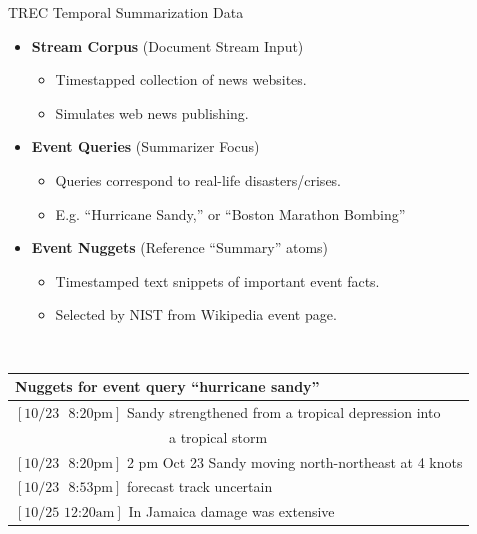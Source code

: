 \begin{frame}{TREC Temporal Summarization Data}
  \begin{itemize}
      \item \alert<2>{\textbf{Stream Corpus}} (Document Stream Input)
    \begin{itemize}
      \item Timestapped collection of news websites.
      \item Simulates web news publishing.
    \end{itemize}
    \item \alert<3>{\textbf{Event Queries}} (Summarizer Focus)
    \begin{itemize}
      \item Queries correspond to real-life disasters/crises.
      \item E.g. ``Hurricane Sandy,'' or ``Boston Marathon Bombing''
    \end{itemize}
    \item \alert<4>{\textbf{Event Nuggets}} (Reference ``Summary'' atoms)
    \begin{itemize}
      \item Timestamped text snippets of important event facts.
      \item Selected by NIST from Wikipedia event page.
    \end{itemize}
  \end{itemize}

~\\

        \begin{tabular}{l}
         \textbf{Nuggets for event query ``hurricane sandy''} \\
        \hline
    $[\textrm{10/23 ~8:20pm}]$ Sandy strengthened from a tropical depression into\\
    ~~~~~~~~~~~~~~~~~~~~~~a tropical storm \\
    $[\textrm{10/23 ~8:20pm}]$ 2 pm Oct 23 Sandy moving north-northeast at 4 
    knots \\
    $[\textrm{10/23 ~8:53pm}]$ forecast track uncertain \\
    $[\textrm{10/25 12:20am}]$ In Jamaica damage was extensive\\
\end{tabular}

\end{frame}

